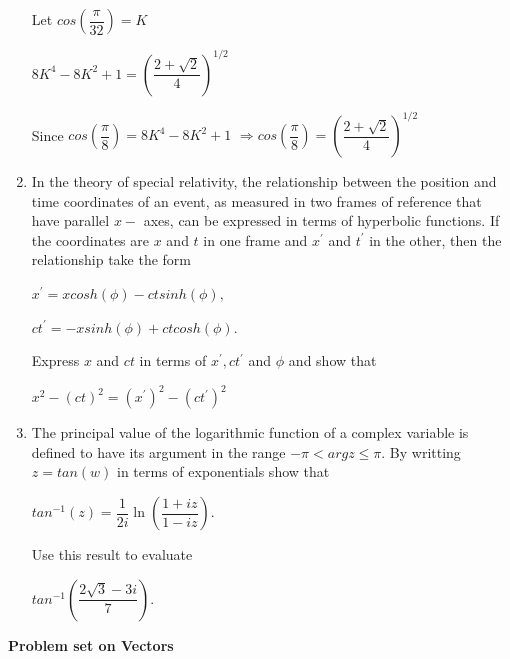 \documentclass[fleqn]{article}
\begin{document}
\begin{enumerate}
    \bigbreak

    Let $cos(\dfrac{\pi}{32})=K$

    \bigbreak

    $8K^4-8K^2+1=(\dfrac{2+\sqrt{2}}{4})^{1/2}$

    Since $cos(\dfrac{\pi}{8})=8K^4-8K^2+1$ $\Longrightarrow cos(\dfrac{\pi}{8})=(\dfrac{2+\sqrt{2}}{4})^{1/2}$ 


  
  \item  In the theory of special relativity, the relationship between the position and time coordinates of an event, as measured in two frames of reference that have parallel $x-$ axes, can be expressed in terms of hyperbolic functions. If the coordinates are $x$ and $t$ in one frame and $x^\prime$ and $t^\prime$ in the other, then the relationship take the form
  
  $x^\prime=x cosh(\phi)-ct sinh(\phi),$
  
  $ct^\prime=-xsinh(\phi)+ct cosh(\phi)$.

  Express $x$ and $ct$ in terms of $x^\prime, ct^\prime$ and $\phi$ and show that 

  $x^2-(ct)^2=(x^\prime)^2-(ct^\prime)^2$
  
  \item The principal value of the logarithmic function of a complex variable is defined to have its argument in the range $-\pi < arg z\leq \pi $. By writting $z=tan(w)$ in terms of exponentials show that

  $tan^{-1}(z)=\dfrac{1}{2i} \ln(\dfrac{1+iz}{1-iz})$.

  Use this result to evaluate

  $tan^{-1}(\dfrac{2\sqrt{3}-3i}{7})$.
  
\end{enumerate}


\pagebreak

\textbf{Problem set on Vectors}
\end{document}
